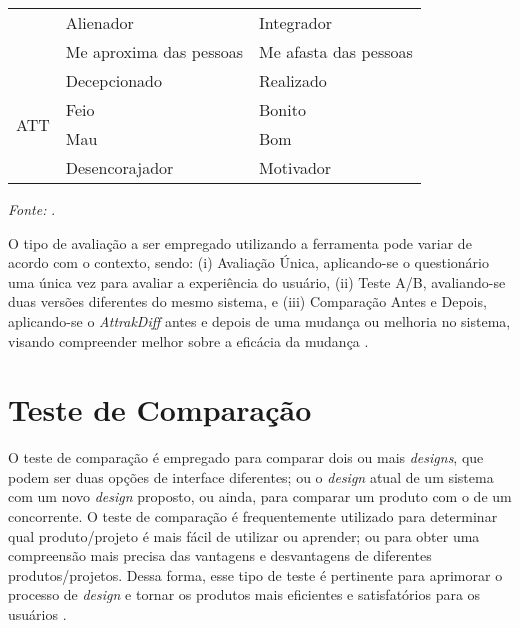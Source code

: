 \begin{table}[h]
\begin{adjustbox}{center}
\begin{tabular}{c|ll}
                         & \multicolumn{1}{l|}{Alienador}               & Integrador            \\ \cline{2-3} 
                         & \multicolumn{1}{l|}{Me aproxima das pessoas} & Me afasta das pessoas \\ \hline
    \multirow{4}{*}{ATT} & \multicolumn{1}{l|}{Decepcionado}            & Realizado             \\ \cline{2-3} 
                         & \multicolumn{1}{l|}{Feio}                    & Bonito                \\ \cline{2-3} 
                         & \multicolumn{1}{l|}{Mau}                     & Bom                   \\ \cline{2-3} 
                         & \multicolumn{1}{l|}{Desencorajador}          & Motivador             \\ \hline
    \end{tabular}
    \end{adjustbox}
    \begin{tablenotes}[flushleft]
      \centering
      \item \textit{Fonte:} \cite{hassenzahl2003}.
    \end{tablenotes}
\end{table}

O tipo de avaliação a ser empregado utilizando a ferramenta pode variar de acordo com o contexto, sendo: (i) Avaliação Única, aplicando-se o questionário uma única vez para avaliar 
a experiência do usuário, (ii) Teste A/B, avaliando-se duas versões diferentes do mesmo sistema, e (iii) Comparação Antes e Depois, aplicando-se o \textit{AttrakDiff} antes e 
depois de uma mudança ou melhoria no sistema,  visando compreender melhor sobre a eficácia da mudança \cite{nzongo2018}.

\section{Teste de Comparação}
\label{sec:Teste de Comparação}

O teste de comparação é empregado para comparar dois ou mais \textit{designs}, que podem ser duas opções de interface diferentes; ou o \textit{design} atual de um sistema com um novo 
\textit{design} proposto, ou ainda, para comparar um produto com o de um concorrente. O teste de comparação é frequentemente utilizado para determinar qual produto/projeto é mais fácil 
de utilizar ou aprender; ou para obter uma compreensão mais precisa das vantagens e desvantagens de diferentes produtos/projetos. Dessa forma, esse tipo de teste é pertinente para aprimorar 
o processo de \textit{design} e tornar os produtos mais eficientes e satisfatórios para os usuários \cite{rubin2011}.

